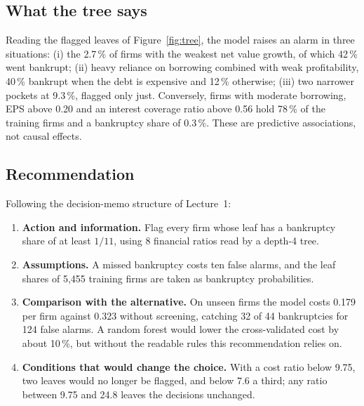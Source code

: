 \documentclass[11pt,a4paper]{article}
\begin{document}
\subsection{What the tree says}
Reading the flagged leaves of Figure~\ref{fig:tree}, the model raises an alarm in three situations: (i) the 2.7\,\% of firms with the weakest net value growth, of which 42\,\% went bankrupt; (ii) heavy reliance on borrowing combined with weak profitability, 40\,\% bankrupt when the debt is expensive and 12\,\% otherwise; (iii) two narrower pockets at 9.3\,\%, flagged only just. Conversely, firms with moderate borrowing, EPS above 0.20 and an interest coverage ratio above 0.56 hold 78\,\% of the training firms and a bankruptcy share of 0.3\,\%. These are predictive associations, not causal effects.

\subsection{Recommendation}
Following the decision-memo structure of Lecture~1:
\begin{enumerate}
  \item \textbf{Action and information.} Flag every firm whose leaf has a bankruptcy share of at least $1/11$, using 8 financial ratios read by a depth-4 tree.
  \item \textbf{Assumptions.} A missed bankruptcy costs ten false alarms, and the leaf shares of 5,455 training firms are taken as bankruptcy probabilities.
  \item \textbf{Comparison with the alternative.} On unseen firms the model costs 0.179 per firm against 0.323 without screening, catching 32 of 44 bankruptcies for 124 false alarms. A random forest would lower the cross-validated cost by about 10\,\%, but without the readable rules this recommendation relies on.
  \item \textbf{Conditions that would change the choice.} With a cost ratio below 9.75, two leaves would no longer be flagged, and below 7.6 a third; any ratio between 9.75 and 24.8 leaves the decisions unchanged.
\end{enumerate}
\end{document}
